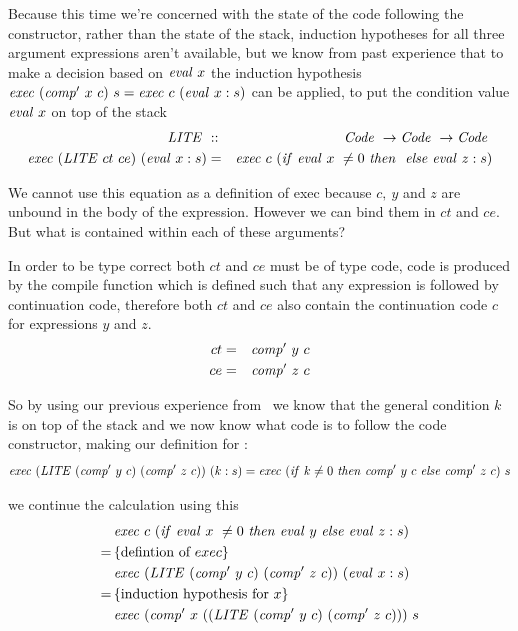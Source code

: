 \documentclass {article}
\begin{document}
\newcommand{\LITE}{\mathit{LITE\ }}
\newcommand{\LITEt}{\textit{LITE}}
Because this time we're concerned with the state of the code 
following the constructor, rather than the state of the stack,
 induction hypotheses for all three argument expressions aren't available,
 but we  know  from past experience
that to make a decision based on $\mathit{eval\ } x$ 
the induction
hypothesis \( \mathit{exec\ } (\mathit{comp'\ }  x\ c)\ s = \mathit{exec\ } c\ (\mathit{eval\ } x:s) \)
can be applied,
to put the condition value $\mathit{eval\ } x$ on top of the stack
\begin{eqnarray}
\LITE &::& \Code \rightarrow \Code \rightarrow \Code \nonumber \\
\Exec (\LITE ct\ ce)\ (\evalf x:s) 
			&=& \Exec c\ (\ifff \evalf x\ \not= 0\ 
				\tthen \ \eelse \evalf  z : s) \nonumber \\
\label{execlite}
\end{eqnarray}

We cannot use this equation as a definition of exec 
because $c,\ y$ and $z$ are unbound in the 
body of the expression\cite[page 10]{bandh}.
However we can bind them in $ct$ and $ce$.
But what is contained within each of these
arguments?

In order to be type correct both $ct$ and $ce$
must be of type code, code is produced by the 
compile function which is defined 
such that any expression is followed by
continuation code,
therefore both $ct$ and $ce$ also contain 
the continuation code $c$ for expressions
 $y$ and $z$.
\begin{eqnarray*}
	ct &=& \mathit{comp'\ }  y\ c \\
	ce &=& \mathit{comp'\ }  z\ c
\end{eqnarray*}

So by using our previous experience from \ite\ we
know that the general condition $k$ is on top of the stack
and we now know what code is to follow the code constructor,
making our definition for \exec: 
\begin{equation*}
	\Exec (\LITE (\Compp  y\ c)\ (\Compp  z\ c) )\ (k:s) 
= \Exec (\ifff k \not= 0\ \tthen \Compp  y\ c\ \eelse \Compp  z\ c)\ s 
\end{equation*}

\noindent we continue the calculation using this
\begin{align*}
	&\Exec c\ (\ifff \evalf  x\ \not= 0\ \tthen \evalf  y\ \eelse \evalf  z : s) \\
	=\, & \{\mbox{defintion of}\ exec\} \\
	&\Exec (\LITE (\Compp  y\ c)\ (\Compp  z\ c) )\ (\evalf  x : s) \\
	=\, & \{\mbox{induction hypothesis for}\ x\} \\
	&\Exec (\Compp  x\ ((\LITE (\Compp  y\ c)\ (\Compp  z\ c)))\ s
\end{align*}
\end{document}
